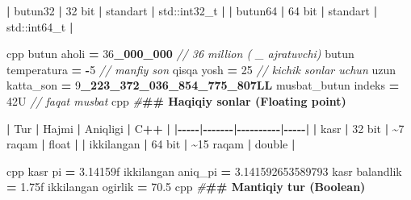 \documentclass[a4paper,11pt,twoside,openright]{book}
\newenvironment{Shaded}{\begin{snugshade}}{\end{snugshade}}
\newcommand{\BuiltInTok}[1]{#1}
\newcommand{\CommentTok}[1]{\textcolor[rgb]{0.56,0.35,0.01}{\textit{#1}}}
\newcommand{\DecValTok}[1]{\textcolor[rgb]{0.00,0.00,0.81}{#1}}
\newcommand{\ErrorTok}[1]{\textcolor[rgb]{0.64,0.00,0.00}{\textbf{#1}}}
\newcommand{\FloatTok}[1]{\textcolor[rgb]{0.00,0.00,0.81}{#1}}
\newcommand{\NormalTok}[1]{#1}
\newcommand{\OperatorTok}[1]{\textcolor[rgb]{0.81,0.36,0.00}{\textbf{#1}}}
\newcommand{\PreprocessorTok}[1]{\textcolor[rgb]{0.56,0.35,0.01}{\textit{#1}}}
\begin{document}
\begin{Shaded}
\begin{Highlighting}[]
\OperatorTok{|} \ErrorTok{\textasciigrave{}}\NormalTok{butun32}\ErrorTok{\textasciigrave{}} \OperatorTok{|} \DecValTok{32}\NormalTok{ bit }\OperatorTok{|}\NormalTok{ standart }\OperatorTok{|} \ErrorTok{\textasciigrave{}}\BuiltInTok{std::}\NormalTok{int32\_t}\ErrorTok{\textasciigrave{}} \OperatorTok{|}
\OperatorTok{|} \ErrorTok{\textasciigrave{}}\NormalTok{butun64}\ErrorTok{\textasciigrave{}} \OperatorTok{|} \DecValTok{64}\NormalTok{ bit }\OperatorTok{|}\NormalTok{ standart }\OperatorTok{|} \ErrorTok{\textasciigrave{}}\BuiltInTok{std::}\NormalTok{int64\_t}\ErrorTok{\textasciigrave{}} \OperatorTok{|}

\ErrorTok{\textasciigrave{}\textasciigrave{}\textasciigrave{}}\NormalTok{cpp}
\NormalTok{butun aholi }\OperatorTok{=} \DecValTok{36}\OperatorTok{\_000\_000}     \CommentTok{// 36 million ( \_ ajratuvchi)}
\NormalTok{butun temperatura }\OperatorTok{=} \OperatorTok{{-}}\DecValTok{5}        \CommentTok{// manfiy son}
\NormalTok{qisqa yosh }\OperatorTok{=} \DecValTok{25}               \CommentTok{// kichik sonlar uchun}
\NormalTok{uzun katta\_son }\OperatorTok{=} \DecValTok{9}\OperatorTok{\_223\_372\_036\_854\_775\_807LL}
\NormalTok{musbat\_butun indeks }\OperatorTok{=} \DecValTok{42}\BuiltInTok{U}     \CommentTok{// faqat musbat}
\ErrorTok{\textasciigrave{}\textasciigrave{}\textasciigrave{}}\NormalTok{cpp}
\PreprocessorTok{\#}\ErrorTok{\#\# Haqiqiy sonlar (Floating point)}

\OperatorTok{|}\NormalTok{ Tur }\OperatorTok{|}\NormalTok{ Hajmi }\OperatorTok{|}\NormalTok{ Aniqligi }\OperatorTok{|}\NormalTok{ C}\OperatorTok{++} \OperatorTok{|}
\OperatorTok{|{-}{-}{-}{-}{-}|{-}{-}{-}{-}{-}{-}{-}|{-}{-}{-}{-}{-}{-}{-}{-}{-}{-}|{-}{-}{-}{-}{-}|}
\OperatorTok{|} \ErrorTok{\textasciigrave{}}\NormalTok{kasr}\ErrorTok{\textasciigrave{}} \OperatorTok{|} \DecValTok{32}\NormalTok{ bit }\OperatorTok{|} \OperatorTok{\textasciitilde{}}\DecValTok{7}\NormalTok{ raqam }\OperatorTok{|} \ErrorTok{\textasciigrave{}}\NormalTok{float}\ErrorTok{\textasciigrave{}} \OperatorTok{|}
\OperatorTok{|} \ErrorTok{\textasciigrave{}}\NormalTok{ikkilangan}\ErrorTok{\textasciigrave{}} \OperatorTok{|} \DecValTok{64}\NormalTok{ bit }\OperatorTok{|} \OperatorTok{\textasciitilde{}}\DecValTok{15}\NormalTok{ raqam }\OperatorTok{|} \ErrorTok{\textasciigrave{}}\NormalTok{double}\ErrorTok{\textasciigrave{}} \OperatorTok{|}

\ErrorTok{\textasciigrave{}\textasciigrave{}\textasciigrave{}}\NormalTok{cpp}
\NormalTok{kasr pi }\OperatorTok{=} \FloatTok{3.14159}\BuiltInTok{f}
\NormalTok{ikkilangan aniq\_pi }\OperatorTok{=} \FloatTok{3.141592653589793}
\NormalTok{kasr balandlik }\OperatorTok{=} \FloatTok{1.75}\BuiltInTok{f}
\NormalTok{ikkilangan ogirlik }\OperatorTok{=} \FloatTok{70.5}
\ErrorTok{\textasciigrave{}\textasciigrave{}\textasciigrave{}}\NormalTok{cpp}
\PreprocessorTok{\#}\ErrorTok{\#\# Mantiqiy tur (Boolean)}


\end{Highlighting}
\end{Shaded}
\end{document}
